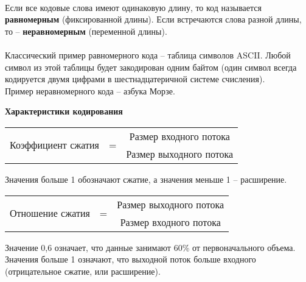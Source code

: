 \\Если все кодовые слова имеют одинаковую длину, то код называется \textbf{равномерным} (фиксированной длины). Если встречаются слова разной длины, то -- \textbf{неравномерным} (переменной длины).
\\
\\Классический пример равномерного кода -- таблица символов ASCII. Любой символ из этой таблицы будет закодирован одним байтом (один символ всегда кодируется двумя цифрами в шестнадцатеричной системе счисления).
\\Пример неравномерного кода -- азбука Морзе.
\\
\begin{center}
  \textbf{Характеристики кодирования}
\end{center}
\begin{table}[h]
\begin{center}
\begin{tabular}{c c c}
\multirow{2}{*}{Коэффициент сжатия} & \multirow{2}{*}{ = }  & Размер входного потока  \\
\hhline{~~--}
 &  & Размер выходного потока
\end{tabular}
\end{center}
Значения больше 1 обозначают сжатие, а значения меньше 1 – расширение.
\end{table}
\begin{table}[h]
\begin{center}
\begin{tabular}{c c c}
\multirow{2}{*}{Отношение сжатия} & \multirow{2}{*}{ = }  & Размер выходного потока  \\
\hhline{~~--}
 &  & Размер входного потока
\end{tabular}
\end{center}
Значение 0,6 означает, что данные занимают 60\% от первоначального объема. Значения больше 1 означают, что выходной поток больше входного (отрицательное сжатие, или расширение).
\end{table}

